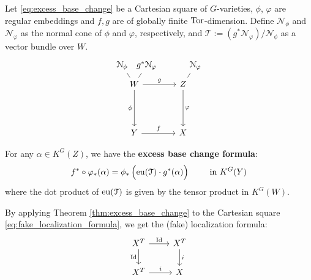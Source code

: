 \begin{theorem}\label{thm:excess_base_change}
Let \eqref{eq:excess_base_change} be a Cartesian square of $G$-varieties, $\phi$, $\varphi$ are regular embeddings and $f,g$ are of globally finite $\operatorname{\operatorname{Tor}}$-dimension. Define $\mathcal{N}_{\phi}$ and $\mathcal{N}_{\varphi}$ as the normal cone of $\phi$ and $\varphi$, respectively, and $\mathcal{T}:=(g^{*}\mathcal{N}_{\varphi})/\mathcal{N}_{\phi}$ as a vector bundle over $W$.
\begin{equation}\label{eq:excess_base_change}
\begin{tikzcd}[row sep={between origins,20mm},column sep={between origins,5mm}]
	{\mathcal{N}_{\phi}} && {g^{*}\mathcal{N}_{\varphi}} &[10mm]& {\mathcal{N}_{\varphi}} \\[-12mm]
	& W && Z \\
	& Y && X
	\arrow["f", from=3-2, to=3-4]
	\arrow["\varphi", from=2-4, to=3-4]
	\arrow["g", from=2-2, to=2-4]
	\arrow["\phi"', from=2-2, to=3-2]
	\arrow[no head, from=1-5, to=2-4]
	\arrow[no head, from=1-3, to=2-2]
	\arrow[no head, from=1-1, to=2-2]
\end{tikzcd}
\end{equation}

For any $\alpha \in K^G(Z)$, we have the \textbf{excess base change formula}:
$$f^* \circ \varphi_{*}(\alpha)=\phi_{*} \left( \eu(\mathcal{T})\cdot g^*(\alpha)\rule{0mm}{4mm}  \right) \qquad \text{ in }K^{G}(Y)$$
where the dot product of $\operatorname{\operatorname{eu}}(\mathcal{T})$ is given by the tensor product in $K^G(W)$.

\end{theorem}

By applying Theorem \ref{thm:excess_base_change} to the Cartesian square \eqref{eq:fake_localization_formula}, we get the (fake) localization formula:
\begin{equation}\label{eq:fake_localization_formula}
\begin{tikzcd}
	{X^T} & {X^T} \\
	{X^T} & X
	\arrow["i", from=1-2, to=2-2]
	\arrow["i", from=2-1, to=2-2]
	\arrow["\Id", from=1-1, to=1-2]
	\arrow["\Id"', from=1-1, to=2-1]
\end{tikzcd}
\end{equation}

